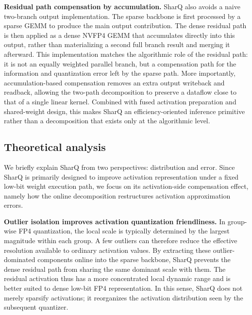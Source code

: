 \documentclass{article}
\begin{document}
\textbf{Residual path compensation by accumulation.}
SharQ also avoids a naive two-branch output implementation. The sparse backbone
is first processed by a sparse GEMM to produce the main output contribution. The
dense residual path is then applied as a dense NVFP4 GEMM that accumulates
directly into this output, rather than materializing a second full branch result
and merging it afterward. This implementation matches the algorithmic role of
the residual path: it is not an equally weighted parallel branch, but a
compensation path for the information and quantization error left by the sparse
path. More importantly, accumulation-based compensation removes an extra output
writeback and readback, allowing the two-path decomposition to preserve a
dataflow close to that of a single linear kernel. Combined with fused activation
preparation and shared-weight design, this makes SharQ an efficiency-oriented
inference primitive rather than a decomposition that exists only at the
algorithmic level.

\subsection{Theoretical analysis}

We briefly explain SharQ from two perspectives: distribution and error. Since
SharQ is primarily designed to improve activation representation under a fixed
low-bit weight execution path, we focus on its activation-side compensation
effect, namely how the online decomposition restructures activation
approximation errors.

\textbf{Outlier isolation improves activation quantization friendliness.}
In group-wise FP4 quantization, the local scale is typically determined by the
largest magnitude within each group. A few outliers can therefore reduce the
effective resolution available to ordinary activation values. By extracting
these outlier-dominated components online into the sparse backbone, SharQ
prevents the dense residual path from sharing the same dominant scale with them.
The residual activation thus has a more concentrated local dynamic range and is
better suited to dense low-bit FP4 representation. In this sense, SharQ does not
merely sparsify activations; it reorganizes the activation distribution seen by
the subsequent quantizer.
\end{document}
